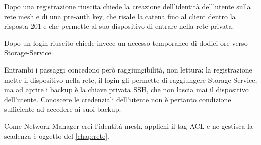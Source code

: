Dopo una registrazione riuscita chiede la creazione dell'identità dell'utente sulla rete mesh e di
una pre-auth key, che risale la catena fino al client dentro la risposta 201 e che permette al suo
dispositivo di entrare nella rete privata.

Dopo un login riuscito chiede invece un accesso temporaneo di dodici ore verso Storage-Service.

Entrambi i passaggi concedono però raggiungibilità, non lettura: la registrazione mette il
dispositivo nella rete, il login gli permette di raggiungere Storage-Service, ma ad aprire i backup è
la chiave privata SSH, che non lascia mai il dispositivo dell'utente. 
Conoscere le credenziali dell'utente non è pertanto condizione sufficiente ad accedere ai suoi backup.

Come Network-Manager crei l'identità mesh, applichi il tag ACL e ne gestisca la scadenza è oggetto
del \autoref{chap:rete}.